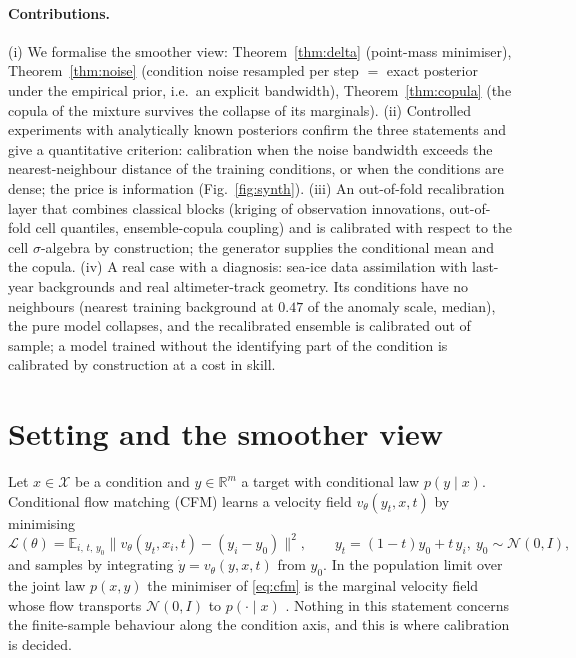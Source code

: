 \documentclass[11pt]{article}
\newcommand{\E}{\mathbb{E}}
\newcommand{\R}{\mathbb{R}}
\begin{document}
\paragraph{Contributions.}
(i) We formalise the smoother view: Theorem~\ref{thm:delta} (point-mass minimiser), Theorem~\ref{thm:noise} (condition noise resampled per step $=$ exact posterior under the empirical prior, i.e.\ an explicit bandwidth), Theorem~\ref{thm:copula} (the copula of the mixture survives the collapse of its marginals).
(ii) Controlled experiments with analytically known posteriors confirm the three statements and give a quantitative criterion: calibration when the noise bandwidth exceeds the nearest-neighbour distance of the training conditions, or when the conditions are dense; the price is information (Fig.~\ref{fig:synth}).
(iii) An out-of-fold recalibration layer that combines classical blocks (kriging of observation innovations, out-of-fold cell quantiles, ensemble-copula coupling) and is calibrated with respect to the cell $\sigma$-algebra by construction; the generator supplies the conditional mean and the copula.
(iv) A real case with a diagnosis: sea-ice data assimilation with last-year backgrounds and real altimeter-track geometry. Its conditions have no neighbours (nearest training background at $0.47$ of the anomaly scale, median), the pure model collapses, and the recalibrated ensemble is calibrated out of sample; a model trained without the identifying part of the condition is calibrated by construction at a cost in skill.

\section{Setting and the smoother view}
\label{sec:setting}
Let $x\in\mathcal X$ be a condition and $y\in\R^m$ a target with conditional law $p(y\mid x)$. Conditional flow matching (CFM) learns a velocity field $v_\theta(y_t,x,t)$ by minimising
\begin{equation}
\mathcal L(\theta)=\E_{i,\,t,\,y_0}\big\|v_\theta(y_t,x_i,t)-(y_i-y_0)\big\|^2,\qquad y_t=(1-t)y_0+t\,y_i,\ y_0\sim\mathcal N(0,I),
\label{eq:cfm}
\end{equation}
and samples by integrating $\dot y=v_\theta(y,x,t)$ from $y_0$. In the population limit over the joint law $p(x,y)$ the minimiser of \eqref{eq:cfm} is the marginal velocity field whose flow transports $\mathcal N(0,I)$ to $p(\cdot\mid x)$ \citep{lipman2023flow,tong2023improving}. Nothing in this statement concerns the finite-sample behaviour along the condition axis, and this is where calibration is decided.
\end{document}
